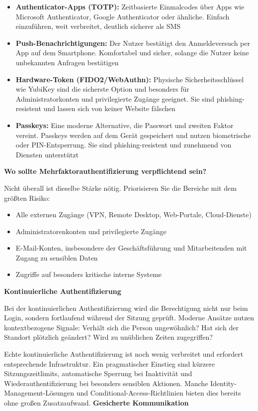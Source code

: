 \begin{itemize}
    \item \textbf{Authenticator-Apps (TOTP):} Zeitbasierte Einmalcodes über Apps wie Microsoft Authenticator, Google Authenticator oder ähnliche. Einfach einzuführen, weit verbreitet, deutlich sicherer als SMS
    \item \textbf{Push-Benachrichtigungen:} Der Nutzer bestätigt den Anmeldeversuch per App auf dem Smartphone. Komfortabel und sicher, solange die Nutzer keine unbekannten Anfragen bestätigen
    \item \textbf{Hardware-Token (FIDO2/WebAuthn):} Physische Sicherheitsschlüssel wie YubiKey sind die sicherste Option und besonders für Administratorkonten und privilegierte Zugänge geeignet. Sie sind phishing-resistent und lassen sich von keiner Website fälschen
    \item \textbf{Passkeys:} Eine moderne Alternative, die Passwort und zweiten Faktor vereint. Passkeys werden auf dem Gerät gespeichert und nutzen biometrische oder PIN-Entsperrung. Sie sind phishing-resistent und zunehmend von Diensten unterstützt
\end{itemize}

\textbf{Wo sollte Mehrfaktorauthentifizierung verpflichtend sein?}

Nicht überall ist dieselbe Stärke nötig. Priorisieren Sie die Bereiche mit dem größten Risiko:

\begin{itemize}
    \item Alle externen Zugänge (VPN, Remote Desktop, Web-Portale, Cloud-Dienste)
    \item Administratorenkonten und privilegierte Zugänge
    \item E-Mail-Konten, insbesondere der Geschäftsführung und Mitarbeitenden mit Zugang zu sensiblen Daten
    \item Zugriffe auf besonders kritische interne Systeme
\end{itemize}

\textbf{Kontinuierliche Authentifizierung}

Bei der kontinuierlichen Authentifizierung wird die Berechtigung nicht nur beim Login, sondern fortlaufend während der Sitzung geprüft. Moderne Ansätze nutzen kontextbezogene Signale: Verhält sich die Person ungewöhnlich? Hat sich der Standort plötzlich geändert? Wird zu unüblichen Zeiten zugegriffen?

Echte kontinuierliche Authentifizierung ist noch wenig verbreitet und erfordert entsprechende Infrastruktur. Ein pragmatischer Einstieg sind kürzere Sitzungszeitlimits, automatische Sperrung bei Inaktivität und Wiederauthentifizierung bei besonders sensiblen Aktionen. Manche Identity-Management-Lösungen und Conditional-Access-Richtlinien bieten dies bereits ohne großen Zusatzaufwand.
\newpage
\textbf{Gesicherte Kommunikation}

